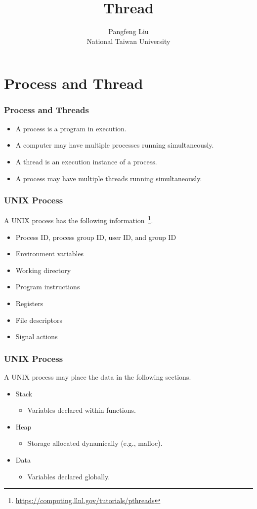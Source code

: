 \documentclass{beamer}
\begin{document}
\title{Thread}

\author{Pangfeng Liu \\ National Taiwan University}

\begin{frame}
\titlepage
\end{frame}

\section{Process and Thread} 

\begin{frame}
\frametitle{Process and Threads}
\begin{itemize}
\item A process is a program in execution.
\item A computer may have multiple processes running simultaneously.
\item A thread is an execution instance of a process.
\item A process may have multiple threads running simultaneously.
\end{itemize}
\end{frame}

\begin{frame}
\frametitle{UNIX Process}
A UNIX process has the following
information~\footnote{\url{https://computing.llnl.gov/tutorials/pthreads}}.
\begin{itemize}
\item Process ID, process group ID, user ID, and group ID
\item Environment variables
\item Working directory
\item Program instructions
\item Registers
\item File descriptors
\item Signal actions
\end{itemize}
\end{frame}

\begin{frame}
\frametitle{UNIX Process}
A UNIX process may place the data in the following sections.
\begin{itemize}
\item Stack
\begin{itemize}
\item Variables declared within functions.
\end{itemize}
\item Heap
\begin{itemize}
\item Storage allocated dynamically (e.g., malloc).
\end{itemize}
\item Data 
\begin{itemize}
\item Variables declared globally.
\end{itemize}
\end{itemize}
\end{frame}
\end{document}
